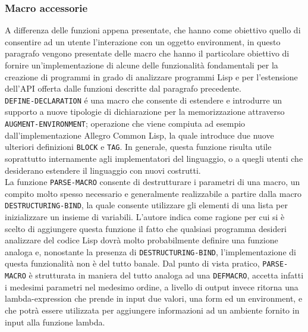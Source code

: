 \subsubsection{Macro accessorie}

A differenza delle funzioni appena presentate, che hanno come obiettivo quello
di consentire ad un utente l'interazione con un oggetto environment, in questo
paragrafo vengono presentate delle macro che hanno il particolare obiettivo di
fornire un'implementazione di alcune delle funzionalità fondamentali per la
creazione di programmi in grado di analizzare programmi Lisp e per
l'estensione dell'API offerta dalle funzioni descritte dal paragrafo
precedente.\\

\texttt{DEFINE-DECLARATION} é una macro che consente di estendere e introdurre
un supporto a nuove tipologie di dichiarazione per la memorizzazione
attraverso \texttt {AUGMENT-ENVIRONMENT}; operazione che viene compiuta ad
esempio dall’implementazione Allegro Common Lisp, la quale introduce due nuove
ulteriori definizioni \texttt{BLOCK} e \texttt{TAG}. In generale, questa
funzione risulta utile soprattutto internamente agli implementatori del
linguaggio, o a quegli utenti che desiderano estendere il linguaggio con nuovi
costrutti.\\

La funzione \texttt{PARSE-MACRO} consente di destrutturare i parametri di una
macro, un compito molto spesso necessario e generalmente realizzabile a
partire dalla macro \texttt{DESTRUCTURING-BIND}, la quale consente utilizzare
gli elementi di una lista per inizializzare un insieme di variabili. L’autore
indica come ragione per cui si è scelto di aggiungere questa funzione il fatto
che qualsiasi programma desideri analizzare del codice Lisp dovrà molto
probabilmente definire una funzione analoga e, nonostante la presenza di
\texttt{DESTRUCTURING-BIND}, l’implementazione di questa funzionalità non è
del tutto banale. \cite{steele1990common} Dal punto di vista pratico, \texttt
{PARSE-MACRO} è strutturata in maniera del tutto analoga ad una
\texttt{DEFMACRO}, accetta infatti i medesimi parametri nel medesimo ordine, a
livello di output invece ritorna una lambda-expression che prende in input
due valori, una form ed un environment, e che potrà essere utilizzata per
aggiungere informazioni ad un ambiente fornito in input alla funzione
lambda.\\

